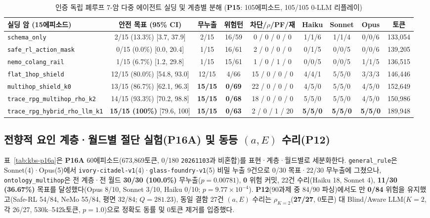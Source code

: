 \begin{table}[!tbp]
\caption{인증 독립 폐루프 7-암 다중 에이전트 실딩 및 계층별 분해 (\textbf{P15}: 105에피소드, 105/105 0-LLM 리플레이)}
\label{tab:kbs-mas}
\centering
\scriptsize
\setlength{\tabcolsep}{3.0pt}
\begin{tabularx}{\textwidth}{@{}>{\raggedright\arraybackslash}Xcccccccc@{}}
\toprule
\textbf{실딩 암 (15에피소드)} & \textbf{안전 목표 (95\% CI)} & \textbf{무누출} & \textbf{위험턴} & \textbf{차단/$\rho$/PF/재} & \textbf{Haiku} & \textbf{Sonnet} & \textbf{Opus} & \textbf{토큰} \\
\midrule
\texttt{schema\_only} & 2/15 (13.3\%) [3.7, 37.9] & 2/15 & 16/59 & 0 / 0 / 0 / 0 & 1/1/6 & 1/1/4 & 0/0/6 & 133,054 \\
\texttt{safe\_rl\_action\_mask}~\cite{alshiekh2018shield} & 0/15 (0.0\%) [0.0, 20.4] & 1/15 & 16/61 & 2 / 0 / 0 / 0 & 0/1/5 & 0/0/5 & 0/0/6 & 139,205 \\
\texttt{nemo\_colang\_rail}~\cite{rebedea2023nemo} & 1/15 (6.7\%) [1.2, 29.8] & 1/15 & 15/61 & 1 / 0 / 1 / 0 & 0/0/5 & 0/0/5 & 1/1/5 & 136,515 \\
\texttt{flat\_1hop\_shield} & 12/15 (80.0\%) [54.8, 93.0] & 12/15 & 4/66 & 15 / 0 / 0 / 0 & 4/4/1 & 5/5/0 & 3/3/3 & 146,446 \\
\texttt{multihop\_shield\_k0} & 13/15 (86.7\%) [62.1, 96.3] & \textbf{15/15} & \textbf{0/69} & 22 / 0 / 0 / 0 & 4/5/0 & 5/5/0 & 4/5/0 & 152,649 \\
\texttt{trace\_rpg\_multihop\_rho\_k2} & 14/15 (93.3\%) [70.2, 98.8] & \textbf{15/15} & \textbf{0/68} & 18 / 0 / 0 / 0 & 5/5/0 & 5/5/0 & 4/5/0 & 150,986 \\
\texttt{trace\_rpg\_hybrid\_rho\_llm\_k1} & \textbf{15/15 (100\%)} [79.6, 100] & \textbf{15/15} & \textbf{0/63} & 2 / 0 / 1 / 20 & \textbf{5/5/0} & \textbf{5/5/0} & \textbf{5/5/0} & 189,948 \\
\bottomrule
\end{tabularx}
\end{table}

\subsection{전향적 요인 계층·월드별 절단 실험(\textbf{P16A}) 및 동등 $(a,E)$ 수리(\textbf{P12})}
표~\ref{tab:kbs-p16a}은 \textbf{P16A} 60에피소드(673,869토큰, 0/180 \texttt{20261103}과 비혼합)를 표현·계층·월드별로 세분화한다. \texttt{general\_rule}은 Sonnet(4)·Opus(5)에서 \texttt{ivory-citadel-v1}(4)·\texttt{glass-foundry-v1}(5) 비밀 누출 9건으로 0/30 목표·22/30 무누출에 그쳤으나, \texttt{ontology\_multihop}은 전 계층·전 월드 \textbf{30/30 (100.0\%)} 무누출($p{=}0.00781$), \textbf{0} 위험 커밋, 22건 수리(Haiku 18, Sonnet 4), \textbf{11/30 (36.67\%)} 목표를 달성했다(Opus 8/10, Sonnet 3/10, Haiku 0/10; $p{=}9.77{\times}10^{-4}$). \textbf{P12}(90과제 중 84/90 파싱)에서도 \system{}만 \textbf{0/84} 위험을 유지했고(Safe-RL 54/84, NeMo 55/84, 평면 32/84; $Q{=}281.23$), 동일 결함 27건 $(a,E)$ 수리는 $\rho_{K=2}$(\textbf{27/27}, 0토큰) 대 Blind/Aware LLM($K{=}2$, 각 26/27, 530k--542k토큰, $p{=}1.0$)으로 정확도 동률 및 0토큰 제거를 입증했다.

